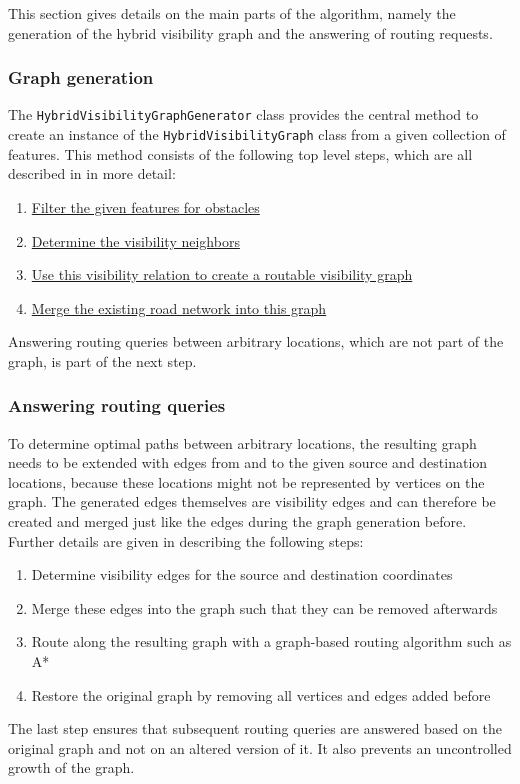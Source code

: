 		This section gives details on the main parts of the algorithm, namely the generation of the hybrid visibility graph and the answering of routing requests.
		
		\subsubsection{Graph generation}
		\label{subsubsec:graph-generation}
		
			The \texttt{HybridVisibilityGraphGenerator} class provides the central method to create an instance of the \texttt{HybridVisibilityGraph} class from a given collection of features.
			This method consists of the following top level steps, which are all described in  in more detail:
			\begin{enumerate}
				\item \hyperref[subsec:step-1-preprocessing]{Filter the given features for obstacles}
				\item \hyperref[subsec:step-2-knn-search]{Determine the visibility neighbors}
				\item \hyperref[subsec:step-3-graph-creation]{Use this visibility relation to create a routable visibility graph}
				\item \hyperref[subsec:step-4-graph merging]{Merge the existing road network into this graph}
			\end{enumerate}
			Answering routing queries between arbitrary locations, which are not part of the graph, is part of the next step.
		
		\subsubsection{Answering routing queries}
		
			To determine optimal paths between arbitrary locations, the resulting graph needs to be extended with edges from and to the given source and destination locations, because these locations might not be represented by vertices on the graph.
			The generated edges themselves are visibility edges and can therefore be created and merged just like the edges during the graph generation before.
			Further details are given in  describing the following steps:
			\begin{enumerate}
				\item Determine visibility edges for the source and destination coordinates
				\item Merge these edges into the graph such that they can be removed afterwards
				\item Route along the resulting graph with a graph-based routing algorithm such as A*
				\item Restore the original graph by removing all vertices and edges added before
			\end{enumerate}
			The last step ensures that subsequent routing queries are answered based on the original graph and not on an altered version of it.
			It also prevents an uncontrolled growth of the graph.
	
